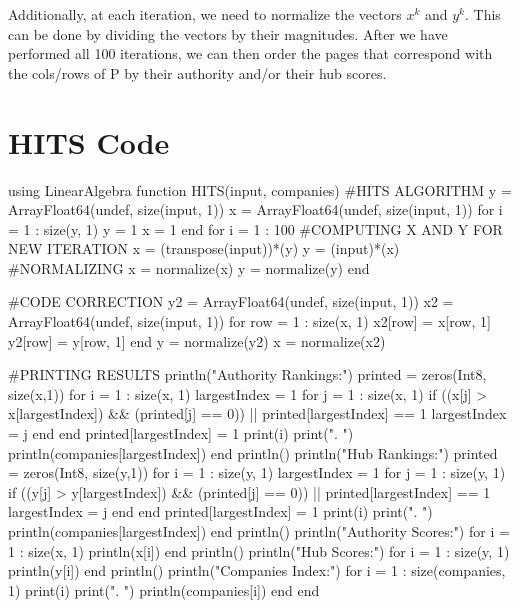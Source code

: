 \documentclass{article}
\begin{document}
Additionally, at each iteration, we need to normalize the vectors $x^k$ and $y^k$. This can be done by dividing the vectors by their magnitudes. After we have performed all 100 iterations, we can then order the pages that correspond with the cols/rows of P by their authority and/or their hub scores.





\section{HITS Code}
\begin{codeblock}
using LinearAlgebra
function HITS(input, companies)
    #HITS ALGORITHM
    y = Array{Float64}(undef, size(input, 1))
    x = Array{Float64}(undef, size(input, 1))
    for i = 1 : size(y, 1)
        y = 1
        x = 1
    end
    for i = 1 : 100
        #COMPUTING X AND Y FOR NEW ITERATION
        x = (transpose(input))*(y)
        y = (input)*(x)
        #NORMALIZING 
        x = normalize(x)
        y = normalize(y)
    end
    
    #CODE CORRECTION
    y2 = Array{Float64}(undef, size(input, 1))
    x2 = Array{Float64}(undef, size(input, 1))
    for row = 1 : size(x, 1)
        x2[row] = x[row, 1]
        y2[row] = y[row, 1]
    end
    y = normalize(y2)
    x = normalize(x2)

    #PRINTING RESULTS
    println("Authority Rankings:")
    printed = zeros(Int8, size(x,1))
    for i = 1 : size(x, 1)
        largestIndex = 1
        for j = 1 : size(x, 1)
            if ((x[j] > x[largestIndex]) && (printed[j] == 0)) || printed[largestIndex] == 1
                largestIndex = j
            end
        end
        printed[largestIndex] = 1
        print(i)
        print(". ")
        println(companies[largestIndex])
    end
    println()
    println("Hub Rankings:")
    printed = zeros(Int8, size(y,1))
    for i = 1 : size(y, 1)
        largestIndex = 1
        for j = 1 : size(y, 1)
            if ((y[j] > y[largestIndex]) && (printed[j] == 0)) || printed[largestIndex] == 1
                largestIndex = j
            end
        end
        printed[largestIndex] = 1
        print(i)
        print(". ")
        println(companies[largestIndex])
    end
    println()
    println("Authority Scores:")
    for i = 1 : size(x, 1)
        println(x[i])
    end
    println()
    println("Hub Scores:")
    for i = 1 : size(y, 1)
        println(y[i])
    end
    println()
    println("Companies Index:")
    for i = 1 : size(companies, 1)
        print(i)
        print(". ")
        println(companies[i])
    end
end
\end{codeblock}
\end{document}
